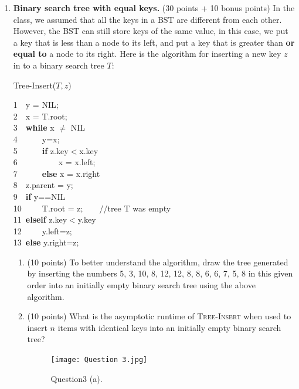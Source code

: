 \documentclass[12pt]{article}
\begin{document}
\begin{enumerate}
{     
     
     }
 

	\item \textbf{Binary search tree with equal keys.} (30 points + 10 bonus points) In the class, we assumed that all the keys in a BST are different from each other. However, the BST can still store keys of the same value, in this case, we put a key that is less than a node to its left, and put a key that is greater than \textbf{or equal to} a node to its right. Here is the algorithm for inserting a new key $z$ in to a binary search tree $T$:
	\begin{algorithm}
		\caption{Tree-Insert($T, z$)}
		1~~y = NIL;\\
		2~~x = T.root;\\
		3~~\textbf{while} x $\neq$ NIL\\
		4~~~~~~y=x;\\
		5~~~~~~\textbf{if} z.key$<$x.key\\
		6~~~~~~~~~~x = x.left;\\
		7~~~~~~\textbf{else} x = x.right\\
		8~~z.parent = y;\\
		9~~\textbf{if} y==NIL\\
		10~~~~~T.root = z;~~~~//tree T was empty\\
		11~\textbf{elseif} z.key$<$y.key\\
		12~~~~~y.left=z;\\
		13~\textbf{else} y.right=z;
	\end{algorithm}

	\begin{enumerate}
		\item (10 points) To better understand the algorithm, draw the tree generated by inserting the numbers 5, 3, 10, 8, 12, 12, 8, 8, 6, 6, 7, 5, 8 in this given order into an initially empty binary search tree using the above algorithm. 
		\item (10 points) What is the asymptotic runtime of \textsc{Tree-Insert} when used to insert $n$ items with identical keys into an initially empty binary search tree?
		\\ {\color{blue}
         \begin{figure}[h]
      	\centering
    	\texttt{[image: Question 3.jpg]}
    	\caption{Question3 (a).}
    	\label{fig:example}
        \end{figure}}
   

\end{enumerate}
\end{enumerate}
\end{document}
